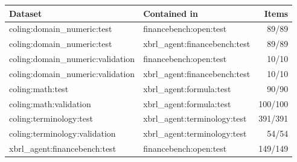 \begin{tabular}{llr}
\toprule
Dataset & Contained in & Items \\
\midrule
coling:domain\_numeric:test & financebench:open:test & 89/89 \\
coling:domain\_numeric:test & xbrl\_agent:financebench:test & 89/89 \\
coling:domain\_numeric:validation & financebench:open:test & 10/10 \\
coling:domain\_numeric:validation & xbrl\_agent:financebench:test & 10/10 \\
coling:math:test & xbrl\_agent:formula:test & 90/90 \\
coling:math:validation & xbrl\_agent:formula:test & 100/100 \\
coling:terminology:test & xbrl\_agent:terminology:test & 391/391 \\
coling:terminology:validation & xbrl\_agent:terminology:test & 54/54 \\
xbrl\_agent:financebench:test & financebench:open:test & 149/149 \\
\bottomrule
\end{tabular}
